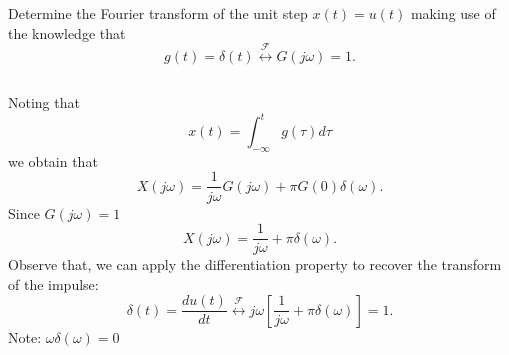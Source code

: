 \begin{frame}[plain]
    \begin{example}
        Determine the Fourier transform of the unit step $x(t) = u(t)$ making use of the knowledge that
    \begin{equation*}
        g(t) = \delta(t)  \overset{\mathcal{F}}{\longleftrightarrow} G(j\omega) = 1.
    \end{equation*}
    \end{example}
    \pause
    \begin{columns}
        {
            Noting that
            \begin{equation*}
                x(t) = \int_{-\infty}^{t} g(\tau)d\tau
            \end{equation*}
            we obtain that
            \begin{equation*}
                X(j\omega) = \frac{1}{ j\omega} G(j\omega) + \pi G(0)\delta(\omega).
            \end{equation*}
            Since $G(j\omega) = 1$
            \begin{equation*}
                X(j\omega) = \frac{1}{ j\omega}  + \pi\delta(\omega).
            \end{equation*}
        }
        \pause
        {
            Observe that, we can apply the differentiation property to recover the transform of the impulse:
            \begin{equation*}
                \delta(t) = \frac{du(t)}{dt}\overset{\mathcal{F}}{\longleftrightarrow} j\omega\left[ \frac{1}{ j\omega}  + \pi\delta(\omega)\right] = 1.
            \end{equation*}
            Note: $\omega \delta(\omega) = 0$
        }
    \end{columns}
\end{frame}


